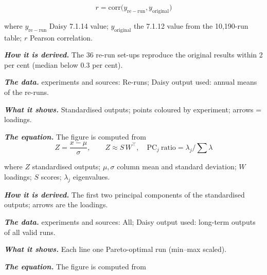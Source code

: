 \begin{equation}\boxed{r=\mathrm{corr}\bigl(y_{\mathrm{re-run}},y_{\mathrm{original}}\bigr)}\end{equation}
\par\noindent where $y_{\mathrm{re-run}}$ Daisy 7.1.14 value; $y_{\mathrm{original}}$ the 7.1.12 value from the 10,190-run table; $r$ Pearson correlation.
\par\noindent\textbf{\color{khmag}\emph{How it is derived.}} The 36 re-run set-ups reproduce the original results within 2 per cent (median below 0.3 per cent).
\par\noindent\textbf{\color{khmag}\emph{The data.}} experiments and sources: Re-runs; Daisy output used: annual means of the re-runs.
\par\vspace{6pt}\noindent{}\par\nobreak
{}\label{fig:a21_11}
\par\noindent\textbf{\color{khmag}\emph{What it shows.}} Standardised outputs; points coloured by experiment; arrows = loadings.
\par\noindent\textbf{\color{khmag}\emph{The equation.}} The figure is computed from
\begin{equation}\boxed{Z=\dfrac{x-\mu}{\sigma},\qquad Z\approx S\,W^{\top},\quad \mathrm{PC}_j\ \text{ratio}=\lambda_j/\sum\lambda}\end{equation}
\par\noindent where $Z$ standardised outputs; $\mu,\sigma$ column mean and standard deviation; $W$ loadings; $S$ scores; $\lambda_j$ eigenvalues.
\par\noindent\textbf{\color{khmag}\emph{How it is derived.}} The first two principal components of the standardised outputs; arrows are the loadings.
\par\noindent\textbf{\color{khmag}\emph{The data.}} experiments and sources: All; Daisy output used: long-term outputs of all valid runs.
\par\vspace{6pt}\noindent{}\par\nobreak
{}\label{fig:a21_12}
\par\noindent\textbf{\color{khmag}\emph{What it shows.}} Each line one Pareto-optimal run (min--max scaled).
\par\noindent\textbf{\color{khmag}\emph{The equation.}} The figure is computed from
